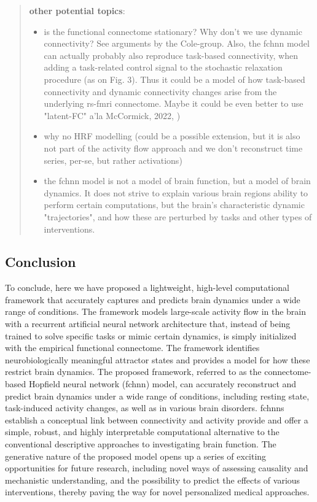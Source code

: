 \documentclass{article}
\begin{document}
\begin{quote}
\textbf{other potential topics}:

\begin{itemize}
\item is the functional connectome stationary? Why don't we use dynamic connectivity? See arguments by the Cole-group. Also, the \acrshort{fchnn} model can actually probably also reproduce task-based connectivity, when adding a task-related control signal to the stochastic relaxation procedure (as on Fig. 3). Thus it could be a model of how task-based connectivity and dynamic connectivity changes arise from the underlying rs-\acrshort{fmri} connectome. Maybe it could be even better to use "latent-FC" a'la McCormick, 2022, \cite{McCormick_2022})
\item why no HRF modelling (could be a possible extension, but it is also not part of the activity flow approach and we don't reconstruct time series, per-se, but rather activations)
\item the \acrshort{fchnn} model is not a model of brain function, but a model of brain dynamics. It does not strive to explain various brain regions ability to perform certain computations, but the brain's characteristic dynamic "trajectories", and how these are perturbed by tasks and other types of interventions.
\end{itemize}
\end{quote}

\subsection{Conclusion}\label{Conclusion}

To conclude, here we have proposed a lightweight, high-level computational framework that accurately captures and predicts brain dynamics under a wide range of conditions. The framework models large-scale activity flow in the brain with a recurrent artificial neural network architecture that, instead of being trained to solve specific tasks or mimic certain dynamics, is simply initialized with the empirical functional connectome. The framework identifies neurobiologically meaningful attractor states and provides a model for how these restrict brain dynamics. The proposed framework, referred to as the connectome-based Hopfield neural network (\acrshort{fchnn}) model, can accurately reconstruct and predict brain dynamics under a wide range of conditions, including resting state, task-induced activity changes, as well as in various brain disorders. \acrshort{fchnn}s establish a conceptual link between connectivity and activity provide and offer a simple, robust, and highly interpretable computational alternative to the conventional descriptive approaches to investigating brain function. The generative nature of the proposed model opens up a series of exciting opportunities for future research, including novel ways of assessing causality and mechanistic understanding, and the possibility to predict the effects of various interventions, thereby paving the way for novel personalized medical approaches.
\end{document}
